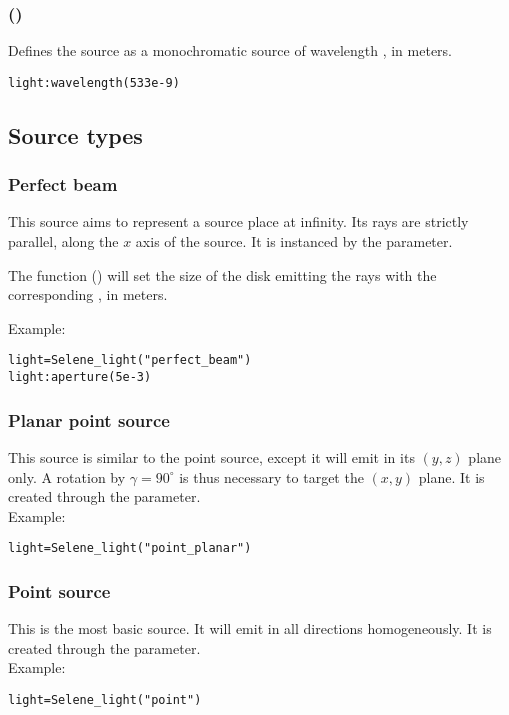 \subsubsection[wavelength]{()}

Defines the source as a monochromatic source of wavelength , in meters.
\begin{lstlisting}
light:wavelength(533e-9)
\end{lstlisting}

\subsection{Source types}

\subsubsection{Perfect beam}

This source aims to represent a source place at infinity. Its rays are strictly parallel, along the $x$ axis of the source. It is instanced by the  parameter.

The function () will set the size of the disk emitting the rays with the corresponding , in meters.

\noindent Example:
\begin{lstlisting}
light=Selene_light("perfect_beam")
light:aperture(5e-3)
\end{lstlisting}

\subsubsection{Planar point source}

This source is similar to the point source, except it will emit in its $(y,z)$ plane only. A rotation by $\gamma=90^\circ$ is thus necessary to target the $(x,y)$ plane. It is created through the  parameter.\\ Example:
\begin{lstlisting}
light=Selene_light("point_planar")
\end{lstlisting}

\subsubsection{Point source}

This is the most basic source. It will emit in all directions homogeneously. It is created through the  parameter.\\ Example:
\begin{lstlisting}
light=Selene_light("point")
\end{lstlisting}

